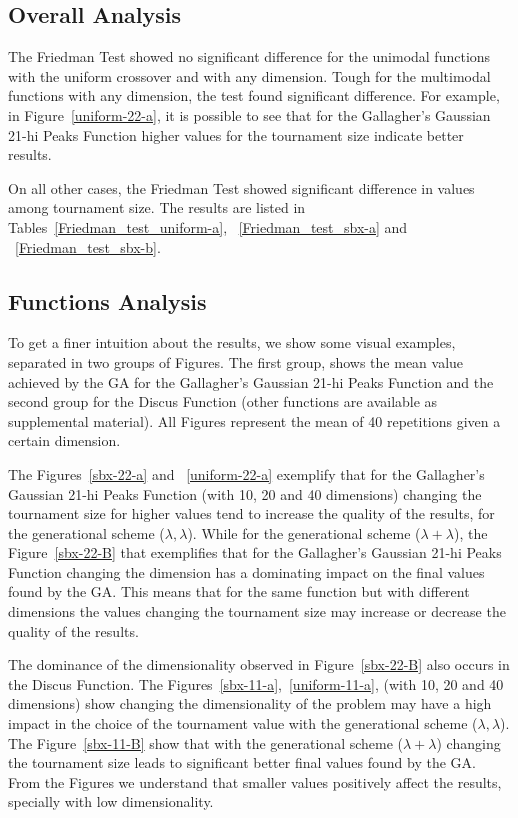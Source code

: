 \subsection{Overall Analysis}

The Friedman Test showed no significant difference for the unimodal functions with the uniform crossover and with any dimension. Tough for the multimodal functions with any dimension, the test found significant difference. For example, in Figure~\ref{uniform-22-a}, it is possible to see that for the Gallagher's Gaussian 21-hi Peaks Function higher values for the tournament size indicate better results.

On all other cases, the Friedman Test showed significant difference in values among tournament size. The results are listed in Tables~\ref{Friedman_test_uniform-a}, ~\ref{Friedman_test_sbx-a} and ~\ref{Friedman_test_sbx-b}.

\subsection{Functions Analysis}

To get a finer intuition about the results, we show some visual examples, separated in two groups of Figures. The first group, shows the mean value achieved by the GA for the Gallagher's Gaussian 21-hi Peaks Function and the second group for the Discus Function (other functions are available as supplemental material). All Figures represent the mean of 40 repetitions given a certain dimension.


The Figures~\ref{sbx-22-a} and ~\ref{uniform-22-a} exemplify that for the Gallagher's Gaussian 21-hi Peaks Function (with 10, 20 and 40 dimensions) changing the tournament size for higher values tend to increase the quality of the results, for the generational scheme ($\lambda, \lambda$). While for the generational scheme ($\lambda + \lambda$), the Figure~\ref{sbx-22-B} that exemplifies that for the Gallagher's Gaussian 21-hi Peaks Function changing the dimension has a dominating impact on the final values found by the GA. This means that for the same function but with different dimensions the values changing the tournament size may increase or decrease the quality of the results.

The dominance of the dimensionality observed in Figure~\ref{sbx-22-B} also occurs in the Discus Function. The Figures~\ref{sbx-11-a},~\ref{uniform-11-a}, (with 10, 20 and 40 dimensions) show  changing the dimensionality of the problem may have a high impact in the choice of the tournament value with the generational scheme ($\lambda, \lambda$). The Figure~\ref{sbx-11-B} show that with the generational scheme ($\lambda + \lambda$) changing the tournament size leads to significant better final values found by the GA. From the Figures we understand that smaller values positively affect the results, specially with low dimensionality. 

